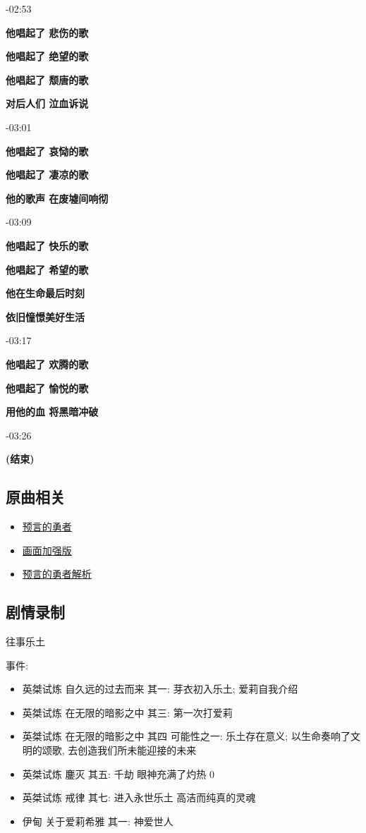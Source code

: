 \documentclass[a4paper]{article}
\begin{document}
-02:53

\textbf{他唱起了 悲伤的歌}

\textbf{他唱起了 绝望的歌}

\textbf{他唱起了 颓唐的歌}

\textbf{对后人们 泣血诉说}

-03:01

\textbf{他唱起了 哀恸的歌}

\textbf{他唱起了 凄凉的歌}

\textbf{他的歌声 在废墟间响彻}

-03:09

\textbf{他唱起了 快乐的歌}

\textbf{他唱起了 希望的歌}

\textbf{他在生命最后时刻}

\textbf{依旧憧憬美好生活}

-03:17

\textbf{他唱起了 欢腾的歌}

\textbf{他唱起了 愉悦的歌}

\textbf{用他的血 将黑暗冲破}

-03:26

\textbf{(结束)}

\subsection{原曲相关}

\begin{itemize}
    \item \href{https://www.bilibili.com/video/BV1Zf4y1Z75m/}{预言的勇者}
    \item \href{https://www.bilibili.com/video/BV1rr4y177C9/}{画面加强版}
    \item \href{https://www.bilibili.com/video/BV1KT411z7Vr/}{预言的勇者解析}
\end{itemize}

\subsection{剧情录制}

往事乐土

事件:

\begin{itemize}
    \item 英桀试炼 自久远的过去而来 其一: 芽衣初入乐土; 爱莉自我介绍
    \item 英桀试炼 在无限的暗影之中 其三: 第一次打爱莉
    \item 英桀试炼 在无限的暗影之中 其四 可能性之一: 乐土存在意义; 以生命奏响了文明的颂歌, 去创造我们所未能迎接的未来
    \item 英桀试炼 鏖灭 其五: 千劫 眼神充满了灼热 0
    \item 英桀试炼 戒律 其七: 进入永世乐土 高洁而纯真的灵魂
    \item 伊甸 关于爱莉希雅 其一: 神爱世人
\end{itemize}
\end{document}
